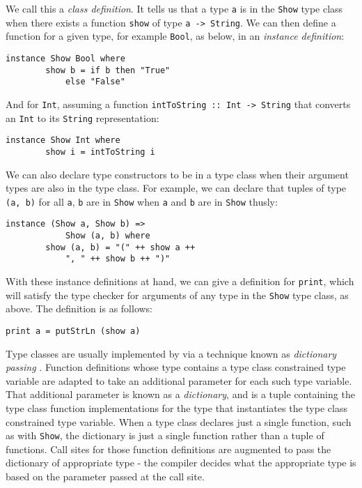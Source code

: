 \noindent We call this a \emph{class definition}. It tells us that a type
\texttt{a} is in the \texttt{Show} type class when there exists a function
\texttt{show} of type \texttt{a -> String}. We can then define a function for a
given type, for example \texttt{Bool}, as below, in an \emph{instance
definition}:
\begin{lstlisting}[mathescape]
    instance Show Bool where
        show b = if b then "True"
            else "False"
\end{lstlisting}

\noindent And for \texttt{Int}, assuming a function \texttt{intToString :: Int
-> String} that converts an \texttt{Int} to its \texttt{String} representation:
\begin{lstlisting}[mathescape]
    instance Show Int where
        show i = intToString i
\end{lstlisting}

\noindent We can also declare type constructors to be in a type class when their
argument types are also in the type class. For example, we can declare that
tuples of type \texttt{(a, b)} for all \texttt{a}, \texttt{b} are in
\texttt{Show} when \texttt{a} and \texttt{b} are in \texttt{Show} thusly:
\begin{lstlisting}[mathescape]
    instance (Show a, Show b) =>
            Show (a, b) where
        show (a, b) = "(" ++ show a ++
            ", " ++ show b ++ ")"
\end{lstlisting}

\noindent With these instance definitions at hand, we can give a definition for
\texttt{print}, which will satisfy the type checker for arguments of any type in
the \texttt{Show} type class, as above. The definition is as follows:
\begin{lstlisting}[mathescape]
    print a = putStrLn (show a)
\end{lstlisting}

Type classes are usually implemented by via a technique known as
\emph{dictionary passing} \cite{K14}. Function definitions whose type contains
a type class constrained type variable are adapted to take an additional
parameter for each such type variable. That additional parameter is known as a
\emph{dictionary}, and is a tuple containing the type class function
implementations for the type that instantiates the type class constrained type
variable. When a type class declares just a single function, such as with
\texttt{Show}, the dictionary is just a single function rather than a tuple of
functions. Call sites for those function definitions are augmented to pass
the dictionary of appropriate type - the compiler decides what the
appropriate type is based on the parameter passed at the call site.

